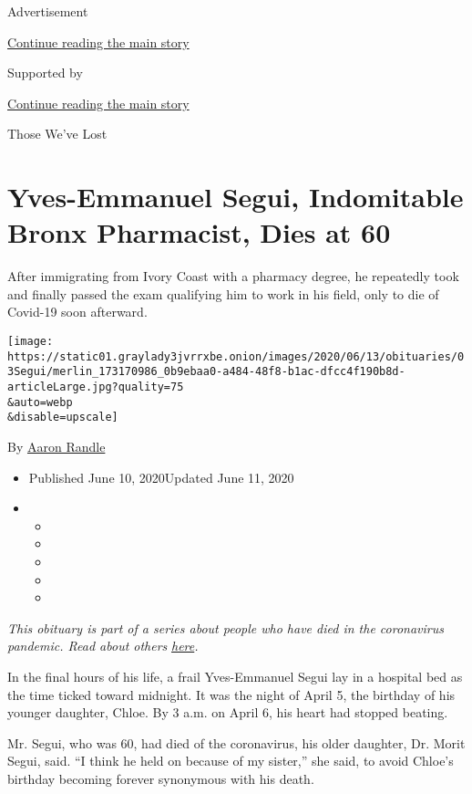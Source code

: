 Advertisement

\protect\hyperlink{after-top}{Continue reading the main story}

Supported by

\protect\hyperlink{after-sponsor}{Continue reading the main story}

Those We've Lost

\hypertarget{yves-emmanuel-segui-indomitable-bronx-pharmacist-dies-at-60}{%
\section{Yves-Emmanuel Segui, Indomitable Bronx Pharmacist, Dies at
60}\label{yves-emmanuel-segui-indomitable-bronx-pharmacist-dies-at-60}}

After immigrating from Ivory Coast with a pharmacy degree, he repeatedly
took and finally passed the exam qualifying him to work in his field,
only to die of Covid-19 soon afterward.

\texttt{[image: https://static01.graylady3jvrrxbe.onion/images/2020/06/13/obituaries/03Segui/merlin\_173170986\_0b9ebaa0-a484-48f8-b1ac-dfcc4f190b8d-articleLarge.jpg?quality=75\\\&auto=webp\\\&disable=upscale]}

By \href{https://www.nytimes3xbfgragh.onion/by/aaron-randle}{Aaron
Randle}

\begin{itemize}
\item
  Published June 10, 2020Updated June 11, 2020
\item
  \begin{itemize}
  \item
  \item
  \item
  \item
  \item
  \end{itemize}
\end{itemize}

\emph{This obituary is part of a series about people who have died in
the coronavirus pandemic. Read about others}
\href{https://www.nytimes3xbfgragh.onion/interactive/2020/obituaries/people-died-coronavirus-obituaries.html}{\emph{here}}\emph{.}

In the final hours of his life, a frail Yves-Emmanuel Segui lay in a
hospital bed as the time ticked toward midnight. It was the night of
April 5, the birthday of his younger daughter, Chloe. By 3 a.m. on April
6, his heart had stopped beating.

Mr. Segui, who was 60, had died of the coronavirus, his older daughter,
Dr. Morit Segui, said. ``I think he held on because of my sister,'' she
said, to avoid Chloe's birthday becoming forever synonymous with his
death.

